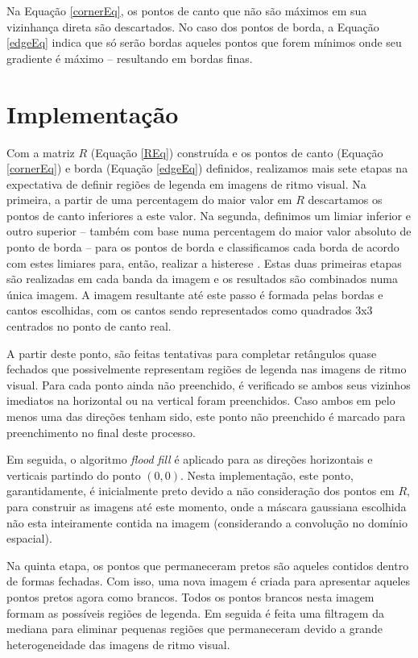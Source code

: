 \documentclass[12pt]{article}
\begin{document}
Na Equação \ref{cornerEq},  os pontos de canto que  não são máximos em
sua vizinhança direta são descartados.  No caso dos pontos de borda, a
Equação  \ref{edgeEq} indica que  só serão  bordas aqueles  pontos que
forem  mínimos onde  seu gradiente  é máximo  -- resultando  em bordas
finas.

\section{Implementação}

Com a matriz  $R$ (Equação \ref{REq}) construída e  os pontos de canto
(Equação  \ref{cornerEq}) e  borda  (Equação \ref{edgeEq})  definidos,
realizamos  mais sete  etapas  na expectativa  de  definir regiões  de
legenda  em imagens  de ritmo  visual. Na  primeira, a  partir  de uma
percentagem  do maior  valor em  $R$  descartamos os  pontos de  canto
inferiores a  este valor. Na  segunda, definimos um limiar  inferior e
outro  superior --  também com  base numa  percentagem do  maior valor
absoluto de ponto de borda --  para os pontos de borda e classificamos
cada  borda de  acordo  com  estes limiares  para,  então, realizar  a
histerese   \cite{snakebook}.   Estas   duas   primeiras  etapas   são
realizadas em cada banda da imagem e os resultados são combinados numa
única  imagem.  A  imagem resultante  até este  passo é  formada pelas
bordas  e cantos escolhidas,  com os  cantos sendo  representados como
quadrados 3x3 centrados no ponto de canto real.

A partir deste ponto,  são feitas tentativas para completar retângulos
quase fechados  que possivelmente  representam regiões de  legenda nas
imagens  de ritmo  visual. Para  cada  ponto ainda  não preenchido,  é
verificado  se  ambos seus  vizinhos  imediatos  na  horizontal ou  na
vertical foram preenchidos.  Caso ambos  em pelo menos uma das direções
tenham sido, este ponto não preenchido é marcado para preenchimento no
final deste processo.

Em  seguida,  o  algoritmo  \textit{flood  fill} é  aplicado  para  as
direções  horizontais e verticais  partindo do  ponto $(0,  0)$. Nesta
implementação, este ponto, garantidamente, é inicialmente preto devido
a não  consideração dos pontos em  $R$, para construir  as imagens até
este momento, onde a máscara gaussiana escolhida não esta inteiramente
contida na imagem (considerando a convolução no domínio espacial).

Na  quinta  etapa,  os  pontos  que permaneceram  pretos  são  aqueles
contidos dentro de formas fechadas. Com isso, uma nova imagem é criada
para apresentar  aqueles pontos pretos  agora como brancos.   Todos os
pontos brancos  nesta imagem formam  as possíveis regiões  de legenda.
Em seguida  é feita  uma filtragem da  mediana para  eliminar pequenas
regiões que  permaneceram devido a grande  heterogeneidade das imagens
de ritmo visual.
\end{document}
